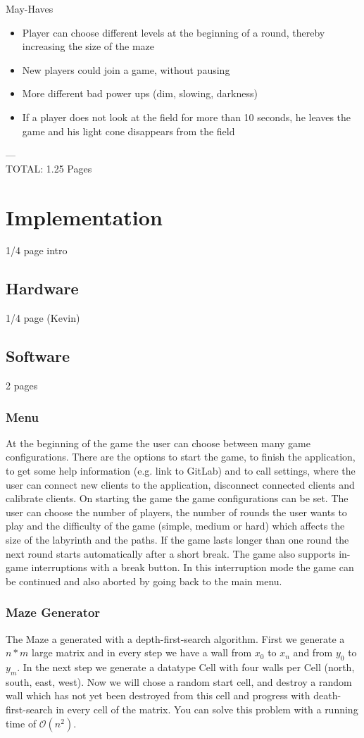\documentclass{sigchi}
\begin{document}
	May-Haves
	\begin{itemize}
		\item Player can choose different levels at the beginning of a round, thereby increasing the size of the maze
		\item New players could join a game, without pausing 
		\item More different bad power ups (dim, slowing, darkness)
		\item If a player does not look at the field for more than 10 seconds, he leaves the game and his light cone disappears from the field
		
	\end{itemize}
---\\
TOTAL: 1.25 Pages

\section{Implementation}
1/4 page intro
\subsection{Hardware}
1/4 page (Kevin)
\subsection{Software}
2 pages
\subsubsection{Menu}
At the beginning of the game the user can choose between many game configurations. There are the options to start the game, to finish the application, to get some help information (e.g. link to GitLab) and to call settings, where the user can connect new clients to the application, disconnect connected clients and calibrate clients. On starting the game the game configurations can be set. The user can choose the number of players, the number of rounds the user wants to play and the difficulty of the game (simple, medium or hard) which affects the size of the labyrinth and the paths. If the game lasts longer than one round the next round starts automatically after a short break. The game also supports in-game interruptions with a break button. In this interruption mode the game can be continued and also aborted by going back to the main menu.
\subsubsection{Maze Generator} 
The Maze a generated with a depth-first-search algorithm. First we generate a $n*m$ large matrix and in every step we have a wall from $x_{0}$ to $x_{n}$ and from $y_{0}$ to $y_{m}$. In the next step we generate a datatype Cell with four walls per Cell (north, south, east, west). Now we will chose a random start cell, and destroy a random wall which has not yet been destroyed from this cell and progress with death-first-search in every cell of the matrix. You can solve this problem with a running time of $\mathcal{O}(n^2)$.
\end{document}
